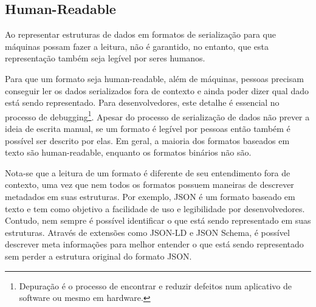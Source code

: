 \subsection[Human-Readable]{Human-Readable}

Ao representar estruturas de dados em formatos de serialização para que máquinas possam fazer a leitura, não é garantido, no entanto, que esta representação também seja legível por seres humanos.

Para que um formato seja human-readable, além de máquinas, pessoas precisam conseguir ler os dados serializados fora de contexto e ainda poder dizer qual dado está sendo representado. Para desenvolvedores, este detalhe é essencial no processo de debugging\footnote{
  Depuração é o processo de encontrar e reduzir defeitos num aplicativo de software ou mesmo em hardware.
}. Apesar do processo de serialização de dados não prever a ideia de escrita manual, se um formato é legível por pessoas então também é possível ser descrito por elas. Em geral, a maioria dos formatos baseados em texto são human-readable, enquanto os formatos binários não são. \cite{SumarayMakki2012}

Nota-se que a leitura de um formato é diferente de seu entendimento fora de contexto, uma vez que nem todos os formatos possuem maneiras de descrever metadados em suas estruturas. Por exemplo, JSON é um formato baseado em texto e tem como objetivo a facilidade de uso e legibilidade por desenvolvedores. Contudo, nem sempre é possível identificar o que está sendo representado em suas estruturas. Através de extensões como JSON-LD e JSON Schema, é possível descrever meta informações para melhor entender o que está sendo representado sem perder a estrutura original do formato JSON.
